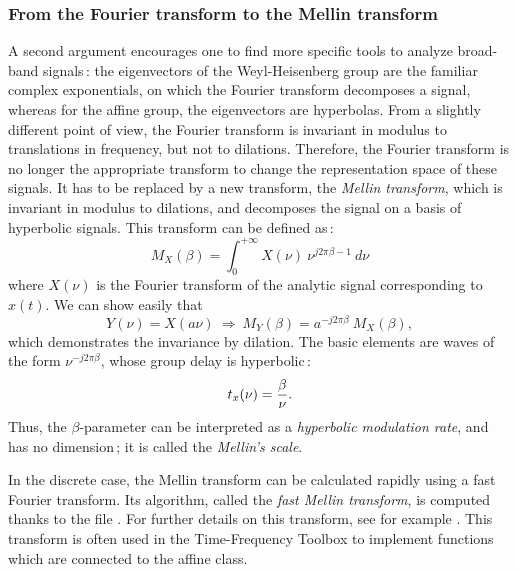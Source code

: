 \subsubsection{From the Fourier transform to the Mellin transform}

  A second argument encourages one to find more specific tools to analyze
broad-band signals\,: the eigenvectors of the Weyl-Heisenberg group are the
familiar complex exponentials, on which the Fourier transform decomposes a
signal, whereas for the affine group, the eigenvectors are hyperbolas. From
a slightly different point of view, the Fourier transform is invariant in
modulus to translations in frequency, but not to dilations. Therefore, the
Fourier transform is no longer the appropriate transform to change the
representation space of these signals. It has to be replaced by a new
transform, the {\it Mellin transform}, which is invariant in modulus to
dilations, and decomposes the signal on a basis of hyperbolic signals. This
transform can be defined as\,:
\[M_X(\beta)=\int_0^{+\infty} X(\nu)\ \nu^{j2\pi \beta-1}\ d\nu\]
where $X(\nu)$ is the Fourier transform of the analytic signal corresponding
to $x(t)$. We can show easily that
\[Y(\nu)=X(a\nu)\ \Rightarrow\ M_Y(\beta)=a^{-j2\pi \beta}\ M_X(\beta),\]
which demonstrates the invariance by dilation. The basic elements are waves
of the form $\nu^{-j2\pi \beta}$, whose group delay is hyperbolic\,:
\[t_x(\nu)={\beta\over\nu}.\]	
Thus, the $\beta$-parameter can be interpreted as a {\it hyperbolic
modulation rate}, and has no dimension\,; it is called the {\it Mellin's
scale}.

In the discrete case, the Mellin transform can be calculated rapidly using
a fast Fourier transform. Its algorithm, called the {\it fast Mellin
transform}, is computed thanks to the file
. For further details on this
transform, see for example \cite{OVA94}. This transform is often used in
the Time-Frequency Toolbox to implement functions which are connected to
the affine class.

